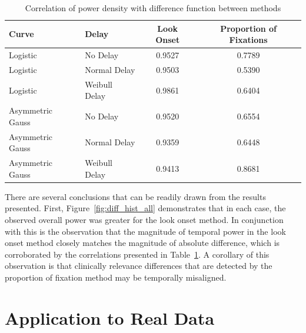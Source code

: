 \documentclass{article}
\begin{document}
\begin{table}[H]
\centering
\begin{tabular}{llcc}
  \hline
Curve & Delay & Look Onset & Proportion of Fixations \\ 
  \hline
Logistic & No Delay & 0.9527 & 0.7789 \\ 
  Logistic & Normal Delay & 0.9503 & 0.5390 \\ 
  Logistic & Weibull Delay & 0.9861 & 0.6404 \\ 
  Asymmetric Gauss & No Delay & 0.9520 & 0.6554 \\ 
  Asymmetric Gauss & Normal Delay & 0.9359 & 0.6448 \\ 
  Asymmetric Gauss & Weibull Delay & 0.9413 & 0.8681 \\ 
   \hline
\end{tabular}
\caption{Correlation of power density with difference function between methods}
\label{tab:correlation_power}
\end{table}

There are several conclusions that can be readily drawn from the results presented. First, Figure~\ref{fig:diff_hist_all} demonstrates that in each case, the observed overall power was greater for the look onset method. In conjunction with this is the observation that the magnitude of temporal power in the look onset method closely matches the magnitude of absolute difference, which is corroborated by the correlations presented in Table~\ref{tab:correlation_power}. A corollary of this observation is that clinically relevance differences that are detected by the proportion of fixation method may be temporally misaligned. 




\section{Application to Real Data}
\end{document}
